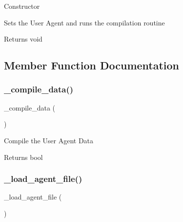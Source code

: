 Constructor

Sets the User Agent and runs the compilation routine

\begin{DoxyReturn}{Returns}
void 
\end{DoxyReturn}


\subsection{Member Function Documentation}
\mbox{\label{class_c_i___user__agent_a4ced3acbcc2ab5e599f212c676590d06}} 
\subsubsection{\texorpdfstring{\+\_\+compile\+\_\+data()}{\_compile\_data()}}
{\footnotesize\ttfamily \+\_\+compile\+\_\+data (\begin{DoxyParamCaption}{ }\end{DoxyParamCaption})\hspace{0.3cm}{\ttfamily [protected]}}

Compile the User Agent Data

\begin{DoxyReturn}{Returns}
bool 
\end{DoxyReturn}
\mbox{\label{class_c_i___user__agent_a96ec01490c667b47c5faec7cb53c34b2}} 
\subsubsection{\texorpdfstring{\+\_\+load\+\_\+agent\+\_\+file()}{\_load\_agent\_file()}}
{\footnotesize\ttfamily \+\_\+load\+\_\+agent\+\_\+file (\begin{DoxyParamCaption}{ }\end{DoxyParamCaption})\hspace{0.3cm}{\ttfamily [protected]}}

